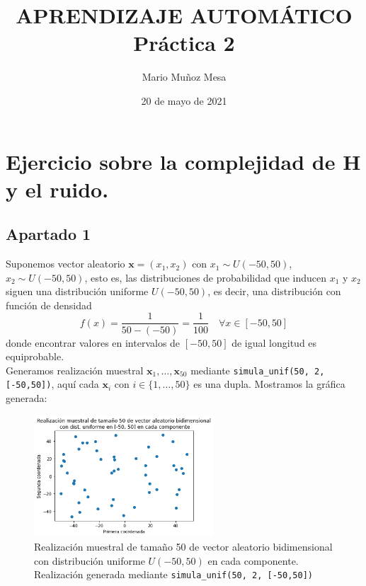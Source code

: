 \documentclass[11pt,a4paper]{article}
\title{
\normalfont \normalsize 
\textsc{\small APRENDIZAJE AUTOMÁTICO} \\ [10pt]
	
	
\huge \bf Práctica 2\\


	}
\author{Mario Muñoz Mesa}
\date{20 de mayo de 2021}
\theoremstyle{definition}
\begin{document}
	\maketitle
	\renewcommand*\contentsname{Índice}	
	\tableofcontents
	
	\newpage
	

	\section{Ejercicio sobre la complejidad de H y el ruido.}
	\subsection{Apartado 1}
	Suponemos vector aleatorio $\mathbf{x}=(x_1, x_2)$ con $x_1 \sim U(-50,50)$, $x_2 \sim U(-50,50)$, esto es, las distribuciones de probabilidad que inducen $x_1$ y $x_2$ siguen una distribución uniforme $U(-50,50)$, es decir, una distribución con función de densidad
	$$f(x)=\frac{1}{50-(-50)}=\frac{1}{100} \quad \forall x \in [-50,50]$$
	donde encontrar valores en intervalos de $[-50,50]$ de igual longitud es equiprobable.
	\\Generamos realización muestral $\mathbf{x}_1,\ldots, \mathbf{x}_{50}$ mediante \texttt{simula\_unif(50, 2, [-50,50])}, aquí cada $\mathbf{x}_i$ con $i\in \{1,\ldots,50\}$ es una dupla. Mostramos la gráfica generada:
	\begin{figure}[H]
		\centering
		\includegraphics[width=0.6\textwidth]{images/dist_50_uniforme}
		\caption{Realización muestral de tamaño 50 de vector aleatorio bidimensional con distribución uniforme $U(-50,50)$ en cada componente. Realización generada mediante \texttt{simula\_unif(50, 2, [-50,50])}}
	\end{figure}
	
\end{document}
